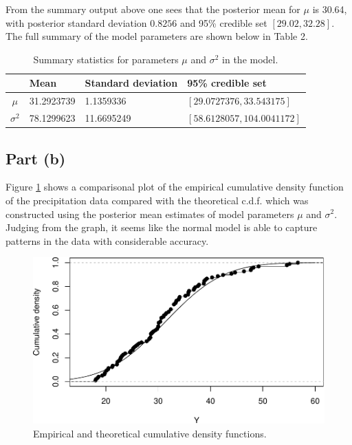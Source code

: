 \documentclass[
]{homework}
\begin{document}
From the summary output above one sees that the posterior mean for \(\mu\) is 30.64, with posterior standard deviation \(0.8256\) and 95\% credible set \([29.02, 32.28]\). The full summary of the model parameters are shown below in Table 2.

\begin{table}[H]
  \centering
  \begin{tabular}{clll}
    \toprule
          & Mean & Standard deviation & 95\% credible set \\
    \midrule
    $\mu$      & 31.2923739 &  1.1359336 & $[29.0727376, 33.543175]$ \\
    $\sigma^2$ & 78.1299623 &  11.6695249 & $[58.6128057, 104.0041172]$ \\
    \bottomrule
  \end{tabular}
  \label{ex2-sum-stats}
  \caption{Summary statistics for parameters $\mu$ and $\sigma^2$ in the model.}
\end{table}

\newpage

\subsection{Part (b)}\label{part-b-1}

Figure \ref{fig:ex2-ecdf-vs-theory} shows a comparisonal plot of the empirical cumulative density function of the precipitation data compared with the theoretical c.d.f. which was constructed using the posterior mean estimates of model parameters \(\mu\) and \(\sigma^2\). Judging from the graph, it seems like the normal model is able to capture patterns in the data with considerable accuracy.

\begin{figure}

{\centering \includegraphics[width=0.75\linewidth]{finalexam_files/figure-latex/ex2-ecdf-vs-theory-1} 

}

\caption{Empirical and theoretical cumulative density functions.}\label{fig:ex2-ecdf-vs-theory}
\end{figure}
\end{document}
